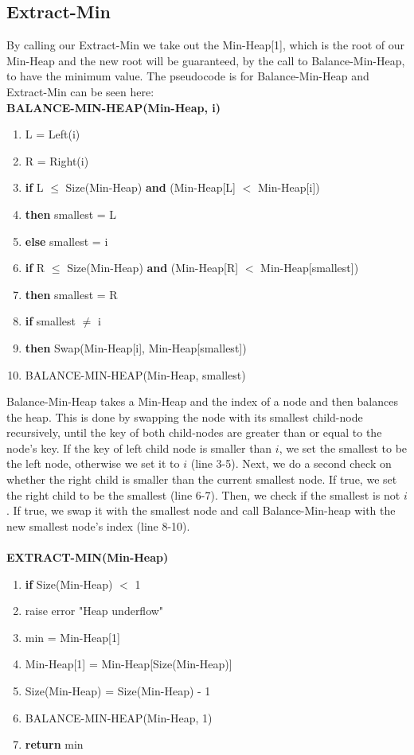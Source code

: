 \documentclass[11pt]{article}
\begin{document}
\subsection{Extract-Min}
By calling our Extract-Min we take out the Min-Heap[1], which is the root of our Min-Heap and the new root will be guaranteed, by the call to Balance-Min-Heap, to have the minimum value. The pseudocode is for Balance-Min-Heap and Extract-Min can be seen here:\\

\textbf{BALANCE-MIN-HEAP(Min-Heap, i)}
\begin{enumerate}
\setlength\itemsep{0em}
\item L = Left(i)
\item R = Right(i)
\item \textbf{if } L $\leq$ Size(Min-Heap) \textbf{and} (Min-Heap[L] $<$ Min-Heap[i])
\item \tab \textbf{then } smallest = L
\item \tab \textbf{else } smallest = i
\item \textbf{if } R $\leq$ Size(Min-Heap) \textbf{and} (Min-Heap[R] $<$ Min-Heap[smallest])
\item \tab \textbf{then } smallest = R
\item \textbf{if } smallest $\neq$ i
\item \tab \textbf{then } Swap(Min-Heap[i], Min-Heap[smallest])
\item \tab \tab BALANCE-MIN-HEAP(Min-Heap, smallest)
\end{enumerate}

\noindent Balance-Min-Heap takes a Min-Heap and the index of a node and then balances the heap. This is done by swapping the node with its smallest child-node recursively, until the key of both child-nodes are greater than or equal to the node's key. If the key of left child node is smaller than $i$, we set the smallest to be the left node, otherwise we set it to $i$ (line 3-5). Next, we do a second check on whether the right child is smaller than the current smallest node. If true, we set the right child to be the smallest (line 6-7). Then, we check if the smallest is not $i$. If true, we swap it with the smallest node and call Balance-Min-heap with the new smallest node's index (line 8-10).\\\\


\textbf{EXTRACT-MIN(Min-Heap)}
\begin{enumerate}
\setlength\itemsep{0em}
\item \textbf{if } Size(Min-Heap) $<$ 1
\item \tab raise error "Heap underflow"
\item min = Min-Heap[1]
\item Min-Heap[1] = Min-Heap[Size(Min-Heap)]
\item Size(Min-Heap) = Size(Min-Heap) - 1
\item BALANCE-MIN-HEAP(Min-Heap, 1)
\item \textbf{return} min
\end{enumerate}
\end{document}

